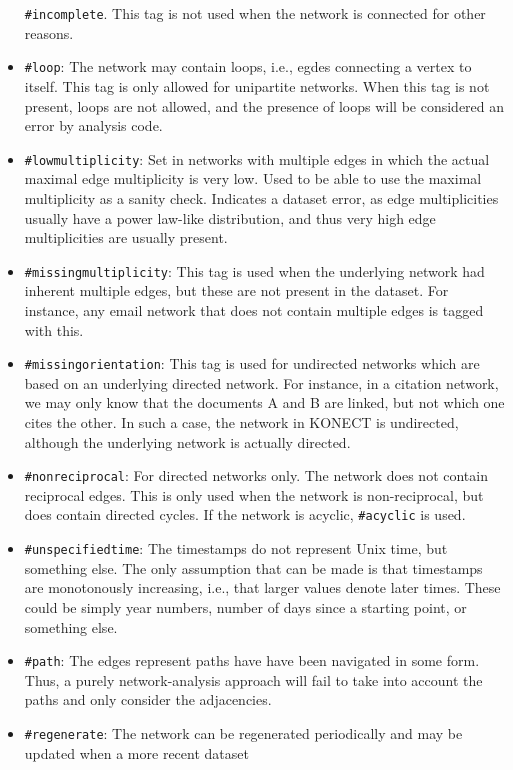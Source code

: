 \documentclass{article}
\begin{document}
\begin{itemize}
  \texttt{\#incomplete}.  This tag is not used when the network
  is connected for other reasons. 
\item \texttt{\#loop}: The network may contain loops, i.e.,
  egdes connecting a vertex to itself.  This tag is only
  allowed for unipartite networks.  When this tag is not
  present, loops are not allowed, and the presence of loops
  will be considered an error by analysis code.
\item \texttt{\#lowmultiplicity}:  Set in networks with multiple
  edges in which the actual maximal edge multiplicity is very
  low.  Used to be able to use the maximal multiplicity as a
  sanity check.  Indicates a dataset error, as edge
  multiplicities usually have a power law-like distribution, and
  thus very high edge multiplicities are usually present. 
\item \texttt{\#missingmultiplicity}:  This tag is used when the
  underlying network had inherent multiple edges, but these are
  not present in the dataset.  For instance, any email network
  that does not contain multiple edges is tagged with this. 
\item \texttt{\#missingorientation}: This tag is used for
  undirected networks which are based on an underlying
  directed network.  For instance, in a citation network, we
  may only know that the documents A and B are linked, but not
  which one cites the other.  In such a case, the network in
  KONECT is undirected, although the underlying network is
  actually directed.
\item \texttt{\#nonreciprocal}:  For directed networks only.
  The network does not contain reciprocal edges.  This is only
  used when the network is non-reciprocal, but does contain
  directed cycles.  If the network is acyclic,
  \texttt{\#acyclic} is used. 
\item \texttt{\#unspecifiedtime}:  The timestamps do not represent Unix
  time, but something else.  The only assumption that can be made is
  that timestamps are monotonously increasing, i.e., that larger values
  denote later times.  These could be simply year numbers, number of
  days since a starting point, or something else. 
\item \texttt{\#path}:  The edges represent paths have have been
  navigated in some form.  Thus, a purely network-analysis approach will
  fail to take into account the paths and only consider the
  adjacencies. 
\item \texttt{\#regenerate}: The network can be regenerated
  periodically and may be updated when a more recent dataset

\end{itemize}
\end{document}

